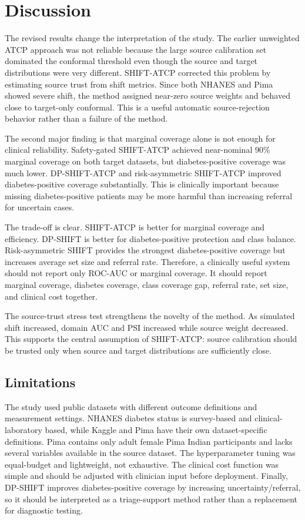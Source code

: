 \documentclass{ieeeaccess}
\begin{document}
\section{Discussion}
The revised results change the interpretation of the study. The earlier unweighted ATCP approach was not reliable because the large source calibration set dominated the conformal threshold even though the source and target distributions were very different. SHIFT-ATCP corrected this problem by estimating source trust from shift metrics. Since both NHANES and Pima showed severe shift, the method assigned near-zero source weights and behaved close to target-only conformal. This is a useful automatic source-rejection behavior rather than a failure of the method.

The second major finding is that marginal coverage alone is not enough for clinical reliability. Safety-gated SHIFT-ATCP achieved near-nominal 90\% marginal coverage on both target datasets, but diabetes-positive coverage was much lower. DP-SHIFT-ATCP and risk-asymmetric SHIFT-ATCP improved diabetes-positive coverage substantially. This is clinically important because missing diabetes-positive patients may be more harmful than increasing referral for uncertain cases.

The trade-off is clear. SHIFT-ATCP is better for marginal coverage and efficiency. DP-SHIFT is better for diabetes-positive protection and class balance. Risk-asymmetric SHIFT provides the strongest diabetes-positive coverage but increases average set size and referral rate. Therefore, a clinically useful system should not report only ROC-AUC or marginal coverage. It should report marginal coverage, diabetes coverage, class coverage gap, referral rate, set size, and clinical cost together.

The source-trust stress test strengthens the novelty of the method. As simulated shift increased, domain AUC and PSI increased while source weight decreased. This supports the central assumption of SHIFT-ATCP: source calibration should be trusted only when source and target distributions are sufficiently close.

\subsection{Limitations}
The study used public datasets with different outcome definitions and measurement settings. NHANES diabetes status is survey-based and clinical-laboratory based, while Kaggle and Pima have their own dataset-specific definitions. Pima contains only adult female Pima Indian participants and lacks several variables available in the source dataset. The hyperparameter tuning was equal-budget and lightweight, not exhaustive. The clinical cost function was simple and should be adjusted with clinician input before deployment. Finally, DP-SHIFT improves diabetes-positive coverage by increasing uncertainty/referral, so it should be interpreted as a triage-support method rather than a replacement for diagnostic testing.
\end{document}
